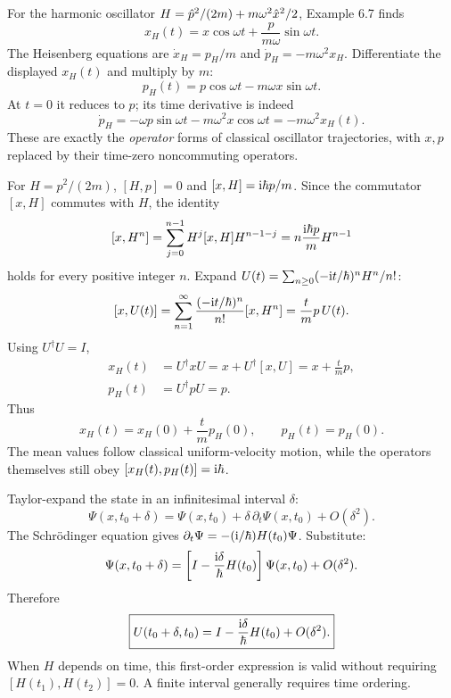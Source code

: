 For the harmonic oscillator
$H=\hat p^2/(2m)+m\omega^2\hat x^2/2$,
Example 6.7 finds
\[
x_H(t)=x\cos\omega t+
\frac{p}{m\omega}\sin\omega t.
\]
The Heisenberg equations are
$\dot x_H=p_H/m$ and
$\dot p_H=-m\omega^2x_H$.
Differentiate the displayed
$x_H(t)$ and multiply by $m$:
\begin{equation}
\boxed{p_H(t)=p\cos\omega t
-m\omega x\sin\omega t.}
\end{equation}
At $t=0$ it reduces to $p$; its
time derivative is indeed
\[
\dot p_H=-\omega p\sin\omega t
-m\omega^2x\cos\omega t
=-m\omega^2x_H(t).
\]
These are exactly the \emph{operator}
forms of classical oscillator
trajectories, with $x,p$
replaced by their time-zero
noncommuting operators.

For $H=p^2/(2m)$,
$[H,p]=0$ and
$[x,H]=\mathrm i\hbar p/m$.
Since the commutator $[x,H]$
commutes with $H$, the identity
\[
[x,H^n]=
\sum_{j=0}^{n-1}H^j[x,H]H^{n-1-j}
=n\frac{\mathrm i\hbar p}{m}H^{n-1}
\]
holds for every positive integer $n$.
Expand $U(t)=\sum_{n\ge0}(-\mathrm i t/\hbar)^nH^n/n!$:
\[
[x,U(t)]=
\sum_{n=1}^{\infty}
\frac{(-\mathrm i t/\hbar)^n}{n!}
[x,H^n]=\frac{t}{m}p\,U(t).
\]
Using $U^\dagger U=I$,
\begin{align}
x_H(t)&=U^\dagger xU
=x+U^\dagger[x,U]
=x+\frac{t}{m}p,\\
p_H(t)&=U^\dagger pU=p.
\end{align}
Thus
\begin{equation}
\boxed{x_H(t)=x_H(0)+
\frac{t}{m}p_H(0),\qquad
p_H(t)=p_H(0).}
\end{equation}
The mean values follow classical
uniform-velocity motion, while
the operators themselves still obey
$[x_H(t),p_H(t)]=\mathrm i\hbar$.

Taylor-expand the state in
an infinitesimal interval $\delta$:
\[
\Psi(x,t_0+\delta)
=\Psi(x,t_0)+\delta\,\partial_t\Psi(x,t_0)
+O(\delta^2).
\]
The Schrödinger equation gives
$\partial_t\Psi=-(\mathrm i/\hbar)H(t_0)\Psi$.
Substitute:
\[
\Psi(x,t_0+\delta)=
\left[I-\frac{\mathrm i\delta}{\hbar}H(t_0)\right]
\Psi(x,t_0)+O(\delta^2).
\]
Therefore
\begin{equation}
\boxed{U(t_0+\delta,t_0)
=I-\frac{\mathrm i\delta}{\hbar}H(t_0)+O(\delta^2).}
\end{equation}
When $H$ depends on time, this
first-order expression is valid
without requiring $[H(t_1),H(t_2)]=0$.
A finite interval generally
requires time ordering.

